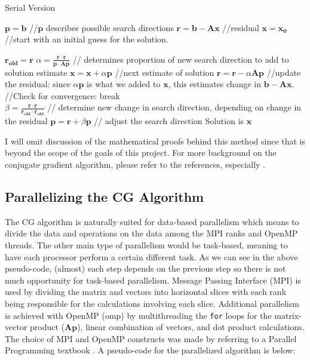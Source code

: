 \documentclass{article}
\begin{document}
\begin{algorithm}[H]
	\begin{algorithmic}[1]
		\caption{Serial Version}
		\State $\mathbf{p} = \mathbf{b}$  //$\mathbf{p}$ describes possible search directions
		\State $\mathbf{r} = \mathbf{b} - \mathbf{Ax}$  //residual
		\State $\mathbf{x} = \mathbf{x_0}$  //start with an initial guess for the solution.
		
		\State $\mathbf{r_{old}} = \mathbf{r}$
		\State $\alpha = \frac{\mathbf{r} \cdot \mathbf{r} }{\mathbf{p} \cdot \mathbf{Ap} }$ // determines proportion of new search direction to add to solution estimate
		\State $\mathbf{x} = \mathbf{x} + \alpha \mathbf{p}$  //next estimate of solution
		\State $\mathbf{r} = \mathbf{r} - \alpha \mathbf{Ap}$ //update the residual: since $\alpha \mathbf{p}$ is what we added to $\mathbf{x}$, this estimates change in $\mathbf{b} - \mathbf{Ax}$. \\
		\State //Check for convergence:
		\State break \\
		\EndIf
		\State $\beta = \frac{\mathbf{r} \cdot \mathbf{r}}{\mathbf{r_{old}} \cdot \mathbf{r_{old}}}$ // determine new change in search direction, depending on change in the residual
		\State $\mathbf{p} = \mathbf{r} + \beta \mathbf{p}$ // adjust the search direction
		\EndFor
		\State Solution is $\mathbf{x}$	
	\end{algorithmic}
\end{algorithm}

I will omit discussion of the mathematical proofs behind this method since that is beyond the scope of the goals of this project. For more background on the conjugate gradient algorithm, please refer to the references, especially \cite{CG_no_pain}.

\subsection{Parallelizing the CG Algorithm}
The CG algorithm is naturally suited for data-based parallelism which means to divide the data and operations on the data among the MPI ranks and OpenMP threads. The other main type of parallelism would be task-based, meaning to have each processor perform a certain different task. As we can see in the above pseudo-code, (almost) each step depends on the previous step so there is not much opportunity for task-based parallelism. Message Passing Interface (MPI) is used by dividing the matrix and vectors into horizontal slices with each rank being responsible for the calculations involving each slice. Additional parallelism is achieved with OpenMP (omp) by multithreading the \texttt{for} loops for the matrix-vector product ($\mathbf{Ap}$), linear combination of vectors, and dot product calculations. The choice of MPI and OpenMP constructs was made by referring to a Parallel Programming textbook \cite{Eijkhout}. A pseudo-code for the parallelized algorithm is below:
\end{document}
